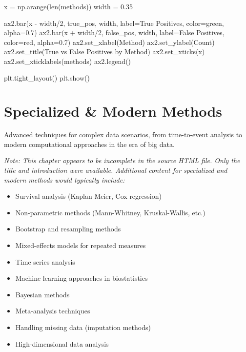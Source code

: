 \documentclass[
  11pt,
  letterpaper,
  oneside]{book}
\newenvironment{Shaded}{\begin{snugshade}}{\end{snugshade}}
\newcommand{\BuiltInTok}[1]{\textcolor[rgb]{0.00,0.23,0.31}{#1}}
\newcommand{\DecValTok}[1]{\textcolor[rgb]{0.68,0.00,0.00}{#1}}
\newcommand{\FloatTok}[1]{\textcolor[rgb]{0.68,0.00,0.00}{#1}}
\newcommand{\NormalTok}[1]{\textcolor[rgb]{0.00,0.23,0.31}{#1}}
\newcommand{\OperatorTok}[1]{\textcolor[rgb]{0.37,0.37,0.37}{#1}}
\newcommand{\StringTok}[1]{\textcolor[rgb]{0.13,0.47,0.30}{#1}}
\providecommand{\tightlist}{%
  \setlength{\itemsep}{0pt}\setlength{\parskip}{0pt}}\usepackage{longtable,booktabs,array}
\begin{document}
\begin{Shaded}
\begin{Highlighting}[]
\NormalTok{x }\OperatorTok{=}\NormalTok{ np.arange(}\BuiltInTok{len}\NormalTok{(methods))}
\NormalTok{width }\OperatorTok{=} \FloatTok{0.35}

\NormalTok{ax2.bar(x }\OperatorTok{{-}}\NormalTok{ width}\OperatorTok{/}\DecValTok{2}\NormalTok{, true\_pos, width, label}\OperatorTok{=}\StringTok{\textquotesingle{}True Positives\textquotesingle{}}\NormalTok{, color}\OperatorTok{=}\StringTok{\textquotesingle{}green\textquotesingle{}}\NormalTok{, alpha}\OperatorTok{=}\FloatTok{0.7}\NormalTok{)}
\NormalTok{ax2.bar(x }\OperatorTok{+}\NormalTok{ width}\OperatorTok{/}\DecValTok{2}\NormalTok{, false\_pos, width, label}\OperatorTok{=}\StringTok{\textquotesingle{}False Positives\textquotesingle{}}\NormalTok{, color}\OperatorTok{=}\StringTok{\textquotesingle{}red\textquotesingle{}}\NormalTok{, alpha}\OperatorTok{=}\FloatTok{0.7}\NormalTok{)}
\NormalTok{ax2.set\_xlabel(}\StringTok{\textquotesingle{}Method\textquotesingle{}}\NormalTok{)}
\NormalTok{ax2.set\_ylabel(}\StringTok{\textquotesingle{}Count\textquotesingle{}}\NormalTok{)}
\NormalTok{ax2.set\_title(}\StringTok{\textquotesingle{}True vs False Positives by Method\textquotesingle{}}\NormalTok{)}
\NormalTok{ax2.set\_xticks(x)}
\NormalTok{ax2.set\_xticklabels(methods)}
\NormalTok{ax2.legend()}

\NormalTok{plt.tight\_layout()}
\NormalTok{plt.show()}
\end{Highlighting}
\end{Shaded}


\chapter{Specialized \& Modern
Methods}\label{specialized-modern-methods}

Advanced techniques for complex data scenarios, from time-to-event
analysis to modern computational approaches in the era of big data.

\emph{Note: This chapter appears to be incomplete in the source HTML
file. Only the title and introduction were available. Additional content
for specialized and modern methods would typically include:}

\begin{itemize}
\tightlist
\item
  Survival analysis (Kaplan-Meier, Cox regression)
\item
  Non-parametric methods (Mann-Whitney, Kruskal-Wallis, etc.)
\item
  Bootstrap and resampling methods
\item
  Mixed-effects models for repeated measures
\item
  Time series analysis
\item
  Machine learning approaches in biostatistics
\item
  Bayesian methods
\item
  Meta-analysis techniques
\item
  Handling missing data (imputation methods)
\item
  High-dimensional data analysis
\end{itemize}
\end{document}
